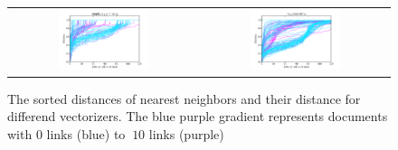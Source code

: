 \begin{figure}[h!]
\begin{tabular}{cc}
\includegraphics[width =0.5\textwidth]{images/thresh_cosine_simple_tag_similarity} 	& \includegraphics[width =0.5\textwidth]{images/thresh_cosine_tag_smoothing}
\end{tabular}
\caption{The sorted distances of nearest neighbors and their distance for differend vectorizers. The blue purple gradient represents documents with 0 links (blue) to $\>10$ links (purple)}
\label{fig:thresholds}
\end{figure}



